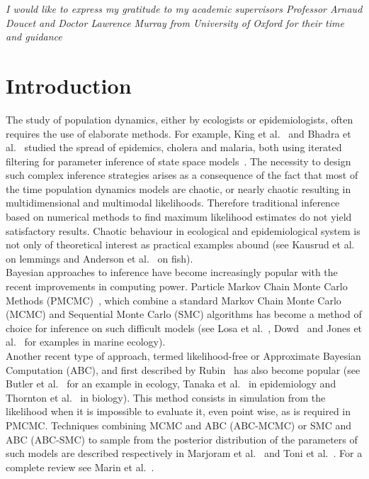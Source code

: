 \documentclass[12pt]{article}
\begin{document}
	\newpage
	\vspace*{80mm}
		\textit{I would like to express my gratitude to my academic supervisors Professor Arnaud Doucet and Doctor Lawrence Murray from University of Oxford for their time and guidance}
	
	\newpage
	
	\listoffigures
	\clearpage
	\listoftables
	\clearpage
	\tableofcontents
	
	\clearpage
	\section{Introduction}
	The study of population dynamics, either by ecologists or epidemiologists, often requires the use of elaborate methods. For example, King et al.~\cite{king2008inapparent} and Bhadra et al.~\cite{bhadra2011malaria} studied the spread of epidemics, cholera and malaria, both using iterated filtering for parameter inference of state space models~\cite{ionides2006inference}. The necessity to design such complex inference strategies arises as a consequence of the fact that most of the time population dynamics models are chaotic, or nearly chaotic resulting in multidimensional and multimodal likelihoods. Therefore traditional inference based on numerical methods to find maximum likelihood estimates do not yield satisfactory results. Chaotic behaviour in ecological and epidemiological system is not only of theoretical interest as practical examples abound (see Kausrud et al.~\cite{kausrud2008linking} on lemmings and Anderson et al.~\cite{anderson2008fishing} on fish). \\
	
	Bayesian approaches to inference have become increasingly popular with the recent improvements in computing power. Particle Markov Chain Monte Carlo Methods (PMCMC)~\cite{andrieu2010particle}, which combine a standard Markov Chain Monte Carlo (MCMC) and Sequential Monte Carlo (SMC) algorithms has become a method of choice for inference on such difficult models (see Losa et al.~\cite{losa2003sequential}, Dowd~\cite{dowd2006sequential} and Jones et al.~\cite{jones2010bayesian} for examples in marine ecology). \\
	
	Another recent type of approach, termed likelihood-free or Approximate Bayesian Computation (ABC), and first described by Rubin~\cite{rubin1984bayesianly} has also become popular (see Butler et al.~\cite{butler57latent} for an example in ecology, Tanaka et al.~\cite{tanaka2006using} in epidemiology and Thornton et al.~\cite{thornton2006approximate} in biology). This method consists in simulation from the likelihood when it is impossible to evaluate it, even point wise, as is required in PMCMC. Techniques combining MCMC and ABC (ABC-MCMC) or SMC and ABC (ABC-SMC) to sample from the posterior distribution of the parameters of such models are described respectively in Marjoram et al.~\cite{marjoram2003markov} and Toni et al.~\cite{toni2009approximate}. For a complete review see Marin et al.~\cite{marin2012approximate}. \\
	
\end{document}
